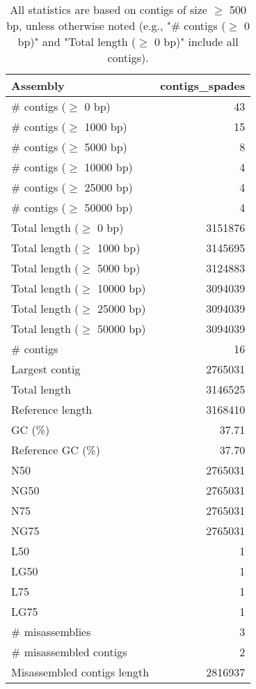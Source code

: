 \documentclass[12pt,a4paper]{article}
\begin{document}
\begin{table}[ht]
\begin{center}
\caption{All statistics are based on contigs of size $\geq$ 500 bp, unless otherwise noted (e.g., "\# contigs ($\geq$ 0 bp)" and "Total length ($\geq$ 0 bp)" include all contigs).}
\begin{tabular}{|l*{1}{|r}|}
\hline
Assembly & contigs\_spades \\ \hline
\# contigs ($\geq$ 0 bp) & 43 \\ \hline
\# contigs ($\geq$ 1000 bp) & 15 \\ \hline
\# contigs ($\geq$ 5000 bp) & 8 \\ \hline
\# contigs ($\geq$ 10000 bp) & 4 \\ \hline
\# contigs ($\geq$ 25000 bp) & 4 \\ \hline
\# contigs ($\geq$ 50000 bp) & 4 \\ \hline
Total length ($\geq$ 0 bp) & 3151876 \\ \hline
Total length ($\geq$ 1000 bp) & 3145695 \\ \hline
Total length ($\geq$ 5000 bp) & 3124883 \\ \hline
Total length ($\geq$ 10000 bp) & 3094039 \\ \hline
Total length ($\geq$ 25000 bp) & 3094039 \\ \hline
Total length ($\geq$ 50000 bp) & 3094039 \\ \hline
\# contigs & 16 \\ \hline
Largest contig & 2765031 \\ \hline
Total length & 3146525 \\ \hline
Reference length & 3168410 \\ \hline
GC (\%) & 37.71 \\ \hline
Reference GC (\%) & 37.70 \\ \hline
N50 & 2765031 \\ \hline
NG50 & 2765031 \\ \hline
N75 & 2765031 \\ \hline
NG75 & 2765031 \\ \hline
L50 & 1 \\ \hline
LG50 & 1 \\ \hline
L75 & 1 \\ \hline
LG75 & 1 \\ \hline
\# misassemblies & 3 \\ \hline
\# misassembled contigs & 2 \\ \hline
Misassembled contigs length & 2816937 \\ \hline

\end{tabular}
\end{center}
\end{table}
\end{document}
